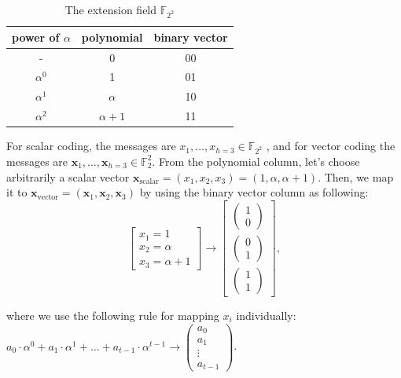 \begin{center}
\begin{table}

\caption{The extension field $\ensuremath{\mathbb{F}}_{2^{2}}$}

\centering{}%
\begin{tabular}{|c|c|c|}
\hline 
power of $\alpha$ & polynomial & binary vector\tabularnewline
\hline 
- & 0 & 00\tabularnewline
\hline 
$\alpha^{0}$ & 1 & 01\tabularnewline
\hline 
$\alpha^{1}$ & $\alpha$ & 10\tabularnewline
\hline 
$\alpha^{2}$ & $\alpha+1$ & 11\tabularnewline
\hline 
\end{tabular}
\end{table}
For scalar coding, the messages are $x_{1},\ldots,x_{h=3}\in\ensuremath{\mathbb{F}}_{2^{2}}$
, and for vector coding the messages are $\boldsymbol{x}_{1},\ldots,\boldsymbol{x}_{h=3}\in\ensuremath{\mathbb{F}}_{2}^{2}$.
From the polynomial column, let's choose arbitrarily a scalar vector
$\boldsymbol{x}_{\mathrm{scalar}}=(x_{1},x_{2},x_{3})=(1,\alpha,\alpha+1)$.
Then, we map it to $\boldsymbol{x}_{\mathrm{vector}}=(\boldsymbol{x}_{1},\boldsymbol{x}_{2},\boldsymbol{x}_{3})$
by using the binary vector column as following:
\[
\left[\begin{array}{c}
x_{1}=1\\
x_{2}=\alpha\\
x_{3}=\alpha+1
\end{array}\right]\rightarrow\left[\begin{array}{c}
\left(\begin{array}{c}
1\\
0
\end{array}\right)\\
\left(\begin{array}{c}
0\\
1
\end{array}\right)\\
\left(\begin{array}{c}
1\\
1
\end{array}\right)
\end{array}\right],
\]
\par\end{center}

where we use the following rule for mapping $x_{i}$ individually:
$a_{0}\cdot\alpha^{0}+a_{1}\cdot\alpha^{1}+\ldots+a_{t-1}\cdot\alpha^{t-1}\rightarrow\left(\begin{array}{c}
a_{0}\\
a_{1}\\
\vdots\\
a_{t-1}
\end{array}\right)$.

